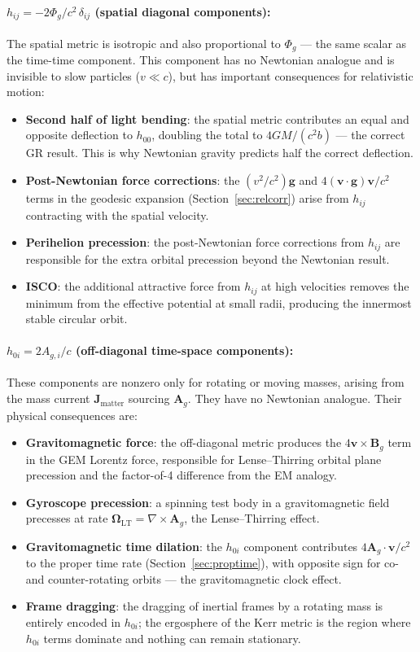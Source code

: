 \documentclass[11pt,a4paper]{article}
\newcommand{\vv}[1]{\mathbf{#1}}
\newcommand{\Phig}{\Phi_g}
\newcommand{\Ag}{\vv{A}_g}
\begin{document}
\paragraph{$h_{ij} = -2\Phig/c^2\,\delta_{ij}$ (spatial diagonal components):}
The spatial metric is isotropic and also proportional to $\Phig$ --- the same scalar as the time-time component.  This component has no Newtonian analogue and is invisible to slow particles ($v\ll c$), but has important consequences for relativistic motion:
\begin{itemize}
  \item \textbf{Second half of light bending}: the spatial metric contributes an equal and opposite deflection to $h_{00}$, doubling the total to $4GM/(c^2 b)$ --- the correct GR result.  This is why Newtonian gravity predicts half the correct deflection.
  \item \textbf{Post-Newtonian force corrections}: the $(v^2/c^2)\vv{g}$ and $4(\vv{v}\cdot\vv{g})\vv{v}/c^2$ terms in the geodesic expansion (Section~\ref{sec:relcorr}) arise from $h_{ij}$ contracting with the spatial velocity.
  \item \textbf{Perihelion precession}: the post-Newtonian force corrections from $h_{ij}$ are responsible for the extra orbital precession beyond the Newtonian result.
  \item \textbf{ISCO}: the additional attractive force from $h_{ij}$ at high velocities removes the minimum from the effective potential at small radii, producing the innermost stable circular orbit.
\end{itemize}

\paragraph{$h_{0i} = 2A_{g,i}/c$ (off-diagonal time-space components):}
These components are nonzero only for rotating or moving masses, arising from the mass current $\vv{J}_{\mathrm{matter}}$ sourcing $\Ag$.  They have no Newtonian analogue.  Their physical consequences are:
\begin{itemize}
  \item \textbf{Gravitomagnetic force}: the off-diagonal metric produces the $4\vv{v}\times\vv{B}_g$ term in the GEM Lorentz force, responsible for Lense--Thirring orbital plane precession and the factor-of-4 difference from the EM analogy.
  \item \textbf{Gyroscope precession}: a spinning test body in a gravitomagnetic field precesses at rate $\boldsymbol{\Omega}_{\mathrm{LT}} = \nabla\times\Ag$, the Lense--Thirring effect.
  \item \textbf{Gravitomagnetic time dilation}: the $h_{0i}$ component contributes $4\Ag\cdot\vv{v}/c^2$ to the proper time rate (Section~\ref{sec:proptime}), with opposite sign for co- and counter-rotating orbits --- the gravitomagnetic clock effect.
  \item \textbf{Frame dragging}: the dragging of inertial frames by a rotating mass is entirely encoded in $h_{0i}$; the ergosphere of the Kerr metric is the region where $h_{0i}$ terms dominate and nothing can remain stationary.
\end{itemize}
\end{document}
